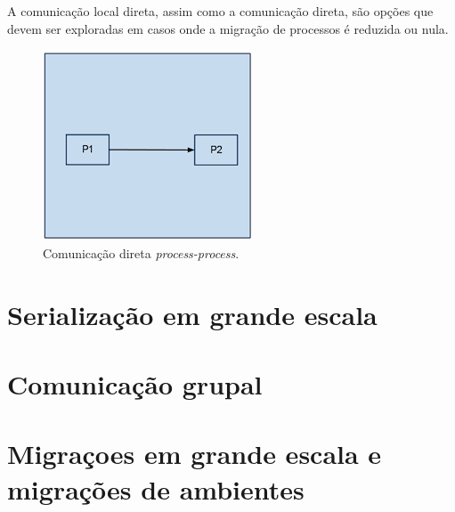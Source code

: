 A comunicação local direta, assim como a comunicação direta, são opções que devem ser exploradas em casos onde a migração de processos é reduzida ou nula.

\begin{figure}
  \centerline{\includegraphics{communication_superdirect.png}}
  \caption{Comunicação direta \textit{process-process}.}
\label{fig:direta_mesmo}
\end{figure}

\section{Serialização em grande escala} %
\section{Comunicação grupal} %
\section{Migraçoes em grande escala e migrações de ambientes \label{migra_ambiente}} %
